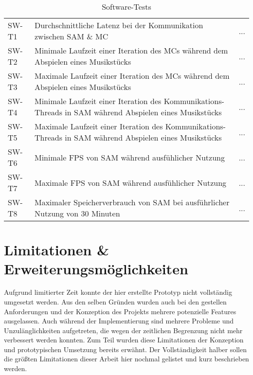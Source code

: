 \begin{table}[htbp]
	\centering
	\begin{tabular}{|l|p{10cm}|l|}
		\theadstart{ID} & \theadcol{Beschreibung} & \theadcol{Ergebnis} \\ \hline
		SW-T1 & Durchschnittliche Latenz bei der Kommunikation zwischen \ac{SAM} \& \ac{MC} & ... \\ \hline
		SW-T2 & Minimale Laufzeit einer Iteration des \ac{MC}s während dem Abspielen eines Musikstücks & ... \\ \hline
		SW-T3 & Maximale Laufzeit einer Iteration des \ac{MC}s während dem Abspielen eines Musikstücks & ... \\ \hline
		SW-T4 & Minimale Laufzeit einer Iteration des Kommunikations-Threads in \ac{SAM} während Abspielen eines Musikstücks & ... \\ \hline
		SW-T5 & Maximale Laufzeit einer Iteration des Kommunikations-Threads in \ac{SAM} während Abspielen eines Musikstücks & ... \\ \hline
		SW-T6 & Minimale \ac{FPS} von \ac{SAM} während ausfühlicher Nutzung & ... \\ \hline
		SW-T7 & Maximale \ac{FPS} von \ac{SAM} während ausfühlicher Nutzung & ... \\ \hline
		SW-T8 & Maximaler Speicherverbrauch von \ac{SAM} bei ausführlicher Nutzung von 30 Minuten & ... \\ \hline
	\end{tabular}
	\caption{Software-Tests}
	\label{table:sw-tests}
\end{table}



\section{Limitationen \& Erweiterungsmöglichkeiten} \label{ergebnisse-limitationen}

Aufgrund limitierter Zeit konnte der hier erstellte Prototyp nicht vollständig umgesetzt werden.
Aus den selben Gründen wurden auch bei den gestellen Anforderungen und der Konzeption des Projekts mehrere potenzielle Features ausgelassen.
Auch während der Implementierung sind mehrere Probleme und Unzulänglichkeiten aufgetreten, die wegen der zeitlichen Begrenzung nicht mehr verbessert werden konnten.
Zum Teil wurden diese Limitationen der Konzeption und prototypischen Umsetzung bereits erwähnt.
Der Vollständigkeit halber sollen die größten Limitationen dieser Arbeit hier nochmal gelistet und kurz beschrieben werden.

